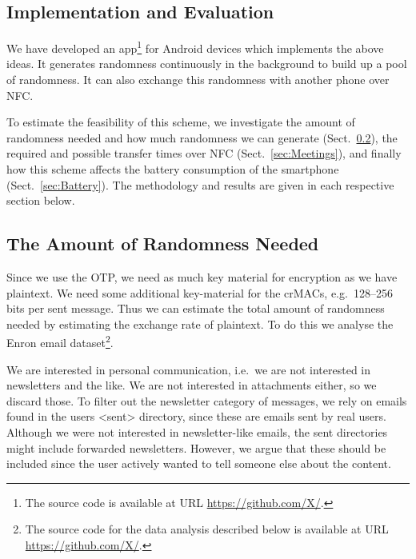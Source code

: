 \subsection{Implementation and Evaluation}

We have developed an app\footnote{%
  The source code is available at URL \url{https://github.com/X/}.
} for Android devices which implements the above ideas.
It generates randomness continuously in the background to build up a pool of 
randomness.
It can also exchange this randomness with another phone over \ac{NFC}.

To estimate the feasibility of this scheme, we investigate the amount of 
randomness needed and how much randomness we can generate 
(Sect.~\ref{sec:NeededRandomness}), the required and possible transfer times 
over \ac{NFC} (Sect.~\ref{sec:Meetings}), and finally how this scheme affects 
the battery consumption of the smartphone (Sect.~\ref{sec:Battery}).
The methodology and results are given in each respective section below.

\subsection{The Amount of Randomness Needed}
\label{sec:NeededRandomness}
Since we use the \ac{OTP}, we need as much key material for encryption as we 
have plaintext.
We need some additional key-material for the \acp{crMAC}, e.g.~128--256 bits 
per sent message.
Thus we can estimate the total amount of randomness needed by estimating the 
exchange rate of plaintext.
To do this we analyse the Enron email dataset\footnote{%
  The source code for the data analysis described below is available at URL 
  \url{https://github.com/X/}.
}.

We are interested in personal communication, i.e.~we are not interested in 
newsletters and the like.
We are not interested in attachments either, so we discard those.
To filter out the newsletter category of messages, we rely on emails found in 
the users <sent> directory, since these are emails sent by real users.
Although we were not interested in newsletter-like emails, the sent directories 
might include forwarded newsletters.
However, we argue that these should be included since the user actively wanted 
to tell someone else about the content.



